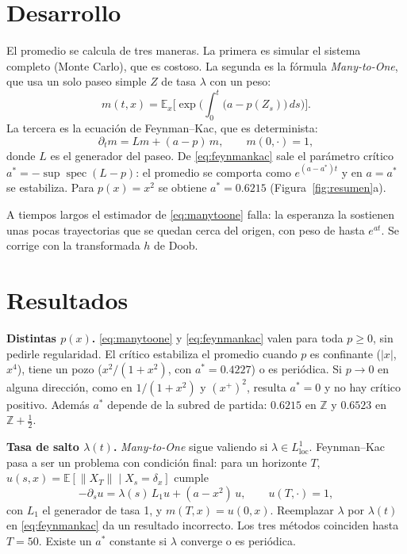 \documentclass{article}
\begin{document}
\section{Desarrollo}
El promedio se calcula de tres maneras. La primera es simular el sistema completo (Monte Carlo), que es costoso. La segunda es la fórmula \textit{Many-to-One}, que usa un solo paseo simple $Z$ de tasa $\lambda$ con un peso:
\begin{equation}
    m(t,x) = \mathbb{E}_x\Big[\exp\Big(\int_0^t \big(a - p(Z_s)\big)\,ds\Big)\Big].
    \label{eq:manytoone}
\end{equation}
La tercera es la ecuación de Feynman--Kac, que es determinista:
\begin{equation}
    \partial_{t} m = L m + (a-p)\,m, \qquad m(0,\cdot)=1,
    \label{eq:feynmankac}
\end{equation}
donde $L$ es el generador del paseo. De \eqref{eq:feynmankac} sale el parámetro crítico $a^*=-\sup\operatorname{spec}(L-p)$: el promedio se comporta como $e^{(a-a^*)t}$ y en $a=a^*$ se estabiliza. Para $p(x)=x^2$ se obtiene $a^*=0.6215$ (Figura~\ref{fig:resumen}a).

A tiempos largos el estimador de \eqref{eq:manytoone} falla: la esperanza la sostienen unas pocas trayectorias que se quedan cerca del origen, con peso de hasta $e^{at}$. Se corrige con la transformada $h$ de Doob.

\section{Resultados}
\textbf{Distintas $p(x)$.} \eqref{eq:manytoone} y \eqref{eq:feynmankac} valen para toda $p\geq 0$, sin pedirle regularidad. El crítico estabiliza el promedio cuando $p$ es confinante ($|x|$, $x^4$), tiene un pozo ($x^2/(1+x^2)$, con $a^*=0.4227$) o es periódica. Si $p\to 0$ en alguna dirección, como en $1/(1+x^2)$ y $(x^+)^2$, resulta $a^*=0$ y no hay crítico positivo. Además $a^*$ depende de la subred de partida: $0.6215$ en $\mathbb{Z}$ y $0.6523$ en $\mathbb{Z}+\tfrac12$.

\textbf{Tasa de salto $\lambda(t)$.} \textit{Many-to-One} sigue valiendo si $\lambda\in L^1_{\mathrm{loc}}$. Feynman--Kac pasa a ser un problema con condición final: para un horizonte $T$, $u(s,x)=\mathbb{E}[\|X_T\|\mid X_s=\delta_x]$ cumple
\begin{equation}
    -\partial_{s} u = \lambda(s)\,L_1 u + (a - x^2)\,u, \qquad u(T,\cdot) = 1,
    \label{eq:backward}
\end{equation}
con $L_1$ el generador de tasa 1, y $m(T,x)=u(0,x)$. Reemplazar $\lambda$ por $\lambda(t)$ en \eqref{eq:feynmankac} da un resultado incorrecto. Los tres métodos coinciden hasta $T=50$. Existe un $a^*$ constante si $\lambda$ converge o es periódica.
\end{document}
